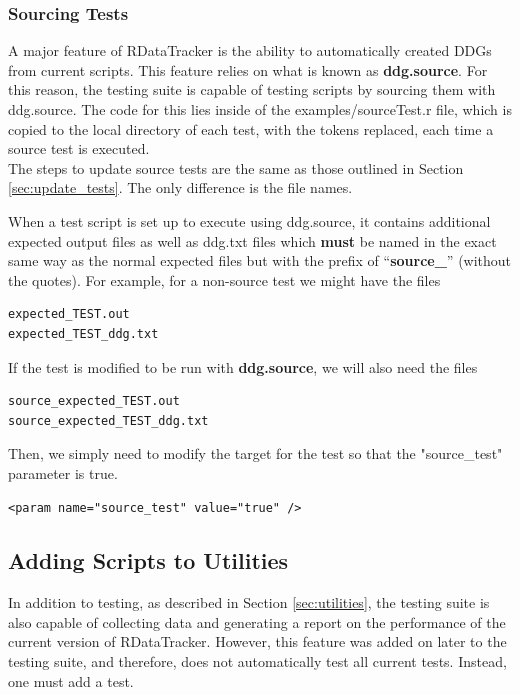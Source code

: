 \documentclass[12pt]{article}
\begin{document}
\subsubsection{Sourcing Tests}
\label{section:source_tests}
A major feature of RDataTracker is the ability to automatically created DDGs from current scripts. This feature relies on what is known as \textbf{ddg.source}. For this reason, the testing suite is capable of testing scripts by sourcing them with ddg.source. The code for this lies inside of the examples/sourceTest.r file, which is copied to the local directory of each test, with the tokens replaced, each time a source test is executed.\\

The steps to update source tests are the same as those outlined in Section \ref{sec:update_tests}. The only difference is the file names. 

\bigskip

When a test script is set up to execute using ddg.source, it contains additional expected output files as well as ddg.txt files which \textbf{must} be named in the exact same way as the normal expected files but with the prefix of ``\textbf{source\_}'' (without the quotes). For example, for a non-source test we might have the files 
\begin{lstlisting}
expected_TEST.out
expected_TEST_ddg.txt
\end{lstlisting}
If the test is modified to be run with \textbf{ddg.source}, we will also need the files
\begin{lstlisting}
source_expected_TEST.out
source_expected_TEST_ddg.txt
\end{lstlisting}
Then, we simply need to modify the target for the test so that the "source\_test" parameter is true.
\begin{lstlisting}
<param name="source_test" value="true" />
\end{lstlisting}

\subsection{Adding Scripts to Utilities}
\label{section:utilities-detail}
In addition to testing, as described in Section \ref{sec:utilities}, the testing suite is also capable of collecting data and generating a report on the performance of the current version of RDataTracker. However, this feature was added on later to the testing suite, and therefore, does not automatically test all current tests. Instead, one must add a test.
\end{document}
